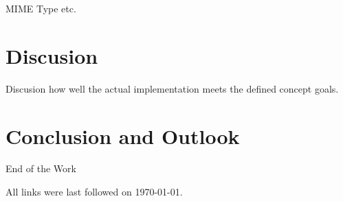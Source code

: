 \documentclass[
a4paper,
twoside,
bibliography=totoc,
headsepline,
cleardoublepage=empty,
parskip=half,
draft=false
]{scrbook}
\begin{document}
				MIME Type etc.
				
	\chapter{Discusion} \label{ch:discusion}
	
		Discusion how well the actual implementation meets the defined concept goals.
		
	\chapter{Conclusion and Outlook} \label{ch:conclusion_and_outlook}
	
		End of the Work
		
	\clearpage
	
	
	
%	
%	
%	
%	
%	
%	
%	
%	
%	
%	
%	
	
	
	
	\printbibliography
	
	All links were last followed on \today.
	
	\pagestyle{empty}
	\renewcommand*{\chapterpagestyle}{empty}
	\Versicherung
\end{document}
